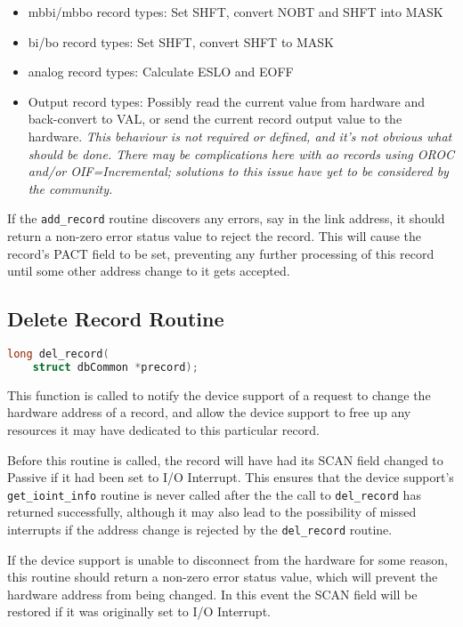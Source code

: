 \begin{itemize}
\item mbbi/mbbo record types:
Set SHFT, convert NOBT and SHFT into MASK

\item bi/bo record types:
Set SHFT, convert SHFT to MASK

\item analog record types:
Calculate ESLO and EOFF

\item Output record types:
Possibly read the current value from hardware and back-convert to VAL, or send the current record output value to the hardware. \emph{This behaviour is not required or defined, and it's not obvious what should be done. There may be complications here with ao records using OROC and/or OIF=Incremental; solutions to this issue have yet to be considered by the community.}

\end{itemize}

If the \verb|add_record| routine discovers any errors, say in the link address, it should return a non-zero error status value to reject the record.
This will cause the record's PACT field to be set, preventing any further processing of this record until some other address change to it gets accepted.

\subsection{Delete Record Routine}

\begin{lstlisting}[language=C]
long del_record(
    struct dbCommon *precord);
\end{lstlisting}

This function is called to notify the device support of a request to change the hardware address of a record, and allow the device support to free up any resources it may have dedicated to this particular record.

Before this routine is called, the record will have had its SCAN field changed to Passive if it had been set to I/O Interrupt.
This ensures that the device support's \verb|get_ioint_info| routine is never called after the the call to \verb|del_record| has returned successfully, although it may also lead to the possibility of missed interrupts if the address change is rejected by the \verb|del_record| routine.

If the device support is unable to disconnect from the hardware for some reason, this routine should return a non-zero error status value, which will prevent the hardware address from being changed.
In this event the SCAN field will be restored if it was originally set to I/O Interrupt.

